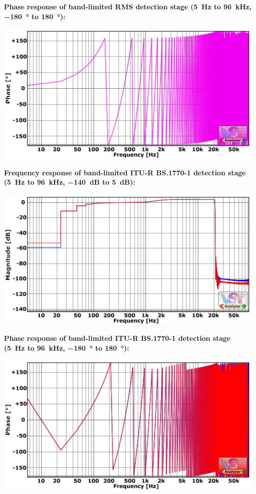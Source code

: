 \textbf{Phase response of band-limited RMS detection stage
  (\SI{5}{\hertz} to \SI{96}{\kilo\hertz}, \SI{-180}{\degree} to
  \SI[addsign]{+180}{\degree}):}

\begin{center}
  \includegraphics[scale=0.60,clip]{include/images/fft_192khz-phase-rms.png}
\end{center}
\newpage %

\textbf{Frequency response of band-limited ITU-R BS.1770-1 detection stage
  (\SI{5}{\hertz} to \SI{96}{\kilo\hertz}, \SI{-140}{\dB} to
  \SI{5}{\dB}):}

\begin{center}
  \includegraphics[scale=0.60,clip]{include/images/fft_192khz-freq-itu_r.png}
\end{center}

\textbf{Phase response of band-limited ITU-R BS.1770-1 detection stage
  (\SI{5}{\hertz} to \SI{96}{\kilo\hertz}, \SI{-180}{\degree} to
  \SI[addsign]{+180}{\degree}):}

\begin{center}
  \includegraphics[scale=0.60,clip]{include/images/fft_192khz-phase-itu_r.png}
\end{center}

